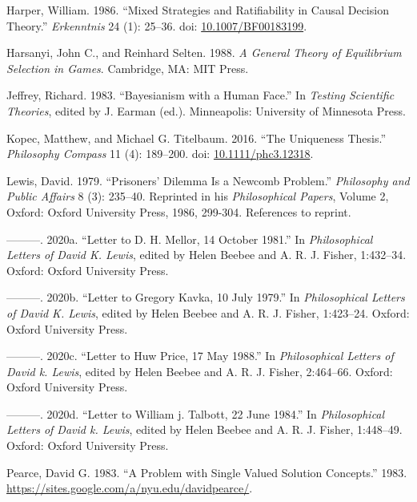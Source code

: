\documentclass[
  11pt,
  letterpaper,
  DIV=11,
  numbers=noendperiod,
  twoside]{scrartcl}
\newlength{\cslhangindent}
\newenvironment{CSLReferences}[2] %
 {\begin{list}{}{%
  \setlength{\itemindent}{0pt}
  \setlength{\leftmargin}{0pt}
  \setlength{\parsep}{0pt}
  \ifodd #1
   \setlength{\leftmargin}{\cslhangindent}
   \setlength{\itemindent}{-1\cslhangindent}
  \fi
  \setlength{\itemsep}{#2\baselineskip}}}
 {\end{list}}
\begin{document}
\begin{CSLReferences}{1}{0}
Harper, William. 1986. {``Mixed Strategies and Ratifiability in Causal
Decision Theory.''} \emph{Erkenntnis} 24 (1): 25--36. doi:
\href{https://doi.org/10.1007/BF00183199}{10.1007/BF00183199}.

Harsanyi, John C., and Reinhard Selten. 1988. \emph{A General Theory of
Equilibrium Selection in Games}. Cambridge, MA: {MIT} Press.

Jeffrey, Richard. 1983. {``Bayesianism with a Human Face.''} In
\emph{Testing Scientific Theories}, edited by J. Earman (ed.).
Minneapolis: University of Minnesota Press.

Kopec, Matthew, and Michael G. Titelbaum. 2016. {``The Uniqueness
Thesis.''} \emph{Philosophy Compass} 11 (4): 189--200. doi:
\href{https://doi.org/10.1111/phc3.12318}{10.1111/phc3.12318}.

Lewis, David. 1979. {``Prisoners' Dilemma Is a {N}ewcomb Problem.''}
\emph{Philosophy and Public Affairs} 8 (3): 235--40. Reprinted in his
\emph{Philosophical Papers}, Volume 2, Oxford: Oxford University Press,
1986, 299-304. References to reprint.

---------. 2020a. {``Letter to {D}. H. Mellor, 14 October 1981.''} In
\emph{Philosophical Letters of David {K}. Lewis}, edited by Helen Beebee
and A. R. J. Fisher, 1:432--34. Oxford: Oxford University Press.

---------. 2020b. {``Letter to Gregory Kavka, 10 July 1979.''} In
\emph{Philosophical Letters of David {K}. Lewis}, edited by Helen Beebee
and A. R. J. Fisher, 1:423--24. Oxford: Oxford University Press.

---------. 2020c. {``Letter to Huw Price, 17 May 1988.''} In
\emph{Philosophical Letters of David k. Lewis}, edited by Helen Beebee
and A. R. J. Fisher, 2:464--66. Oxford: Oxford University Press.

---------. 2020d. {``Letter to William j. Talbott, 22 June 1984.''} In
\emph{Philosophical Letters of David k. Lewis}, edited by Helen Beebee
and A. R. J. Fisher, 1:448--49. Oxford: Oxford University Press.

Pearce, David G. 1983. {``A Problem with Single Valued Solution
Concepts.''} 1983.
\url{https://sites.google.com/a/nyu.edu/davidpearce/}.


\end{CSLReferences}
\end{document}

